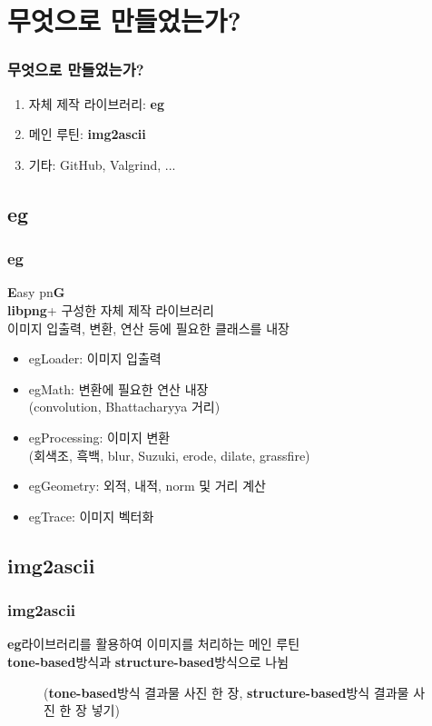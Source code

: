 \documentclass{beamer}
\newcommand{\spacing}{\hspace{0.3em}}
\newcommand{\eg}{\textbf{eg}}
\newcommand{\imgascii}{\textbf{img2ascii}}
\newcommand{\libpng}{\textbf{libpng}}
\newcommand{\Eigen}{\textbf{Eigen}}
\newcommand{\tonebased}{\textbf{tone-based}}
\newcommand{\structurebased}{\textbf{structure-based}}
\begin{document}
\section{무엇으로 만들었는가?}
\begin{frame}{}
	\frametitle{무엇으로 만들었는가?}
	\begin{enumerate}
		\item 자체 제작 라이브러리: \eg
		\item 메인 루틴: \imgascii
		\item 기타: GitHub, Valgrind, ...
	\end{enumerate}
\end{frame}

	\subsection{\eg}
	\begin{frame}{}
		\frametitle{\eg}
		\textbf{E}asy pn\textbf{G} \\
		\libpng \spacing +  구성한 자체 제작 라이브러리 \\
		이미지 입출력, 변환, 연산 등에 필요한 클래스를 내장
		\vspace{1em}
		\begin{itemize}
			\item egLoader: 이미지 입출력
			\item egMath: 변환에 필요한 연산 내장 \\ (convolution, Bhattacharyya 거리)
			\item egProcessing: 이미지 변환 \\ (회색조, 흑백, blur, Suzuki, erode, dilate, grassfire)
			\item egGeometry: 외적, 내적, norm 및 거리 계산
			\item egTrace: 이미지 벡터화
		\end{itemize}
	\end{frame}

	\subsection{\imgascii}
	\begin{frame}{}
		\frametitle{\imgascii}
		\eg \spacing 라이브러리를 활용하여 이미지를 처리하는 메인 루틴 \\
		\tonebased \spacing 방식과 \structurebased \spacing 방식으로 나뉨
		\begin{figure}
			(\tonebased \spacing 방식 결과물 사진 한 장, \structurebased \spacing 방식 결과물 사진 한 장 넣기)
		\end{figure}
	\end{frame}
\end{document}
